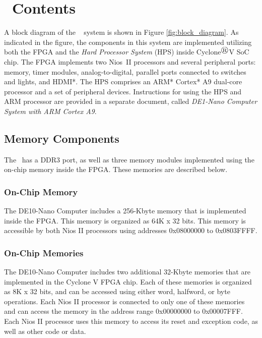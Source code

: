 \section{\systemName~Contents}
A block diagram of the \systemName~ system is shown in Figure \ref{fig:block_diagram}. As indicated in the figure, the components in this system 
are implemented utilizing both the FPGA and the {\it Hard Processor System} (HPS) inside 
Cyclone$^{\registered}$V SoC chip.  The FPGA implements two Nios\textsuperscript{\textregistered}~II processors 
and several peripheral ports: memory, timer modules, analog-to-digital, 
parallel ports connected to switches and lights, and HDMI*.  The HPS comprises an ARM* Cortex* A9 dual-core 
processor and a set of peripheral devices.  Instructions for using the HPS and ARM processor
are provided in a separate document, called {\it DE1-Nano Computer System with ARM Cortex A9}.







\subsection{Memory Components}

The \systemName~has a DDR3 port, as well as three memory modules implemented 
using the on-chip memory inside the FPGA. These memories are described below.



\subsubsection{On-Chip Memory}

The DE10-Nano Computer includes a 256-Kbyte memory that is implemented inside the FPGA.  This 
memory is organized as 64K {\sf x} 32 bits.  This memory is accessible by both Nios II
processors using addresses {\sf 0x08000000} to {\sf 0x0803FFFF}. 

\subsubsection{On-Chip Memories}
The DE10-Nano Computer includes two additional 32-Kbyte memories that are implemented in the
Cyclone V FPGA chip.  Each of these memories is organized as 8K {\sf x} 32 bits, and 
can be accessed using either word, halfword, or byte operations. Each Nios II processor is
connected to only one of these memories and can access the memory in the address range
{\sf 0x00000000} to {\sf 0x00007FFF}. Each Nios II processor uses this memory to access its
reset and exception code, as well as other code or data.


